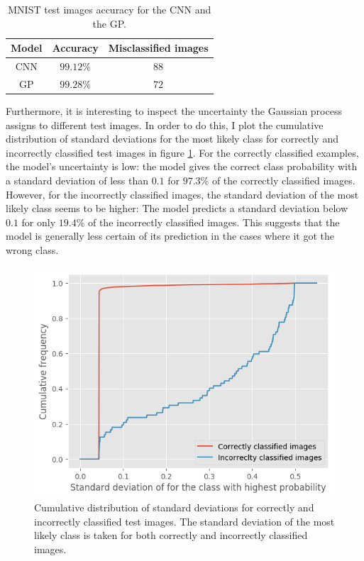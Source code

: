 \documentclass{article}
\begin{document}
\begin{table}[h]
\centering	
{\renewcommand{\arraystretch}{1.4} %
\begin{tabular}{ c | c c}
\textbf{Model} & \textbf{Accuracy} & \textbf{Misclassified images}\\
\hline
CNN & $99.12\%$ & $88$ \\
GP & $99.28\%$  & $72$\\
\end{tabular}
}
\caption{MNIST test images accuracy for the CNN and the GP.}
\label{table/mnist_acc}
\end{table}

Furthermore, it is interesting to inspect the uncertainty the Gaussian process assigns to different test images. In order to do this, I plot the cumulative distribution of standard deviations for the most likely class for correctly and incorrectly classified test images in figure \ref{fig/mnist_cum_stds}. For the correctly classified examples, the model's uncertainty is low: the model gives the correct class probability with a standard deviation of less than $0.1$ for $97.3\%$ of the correctly classified images. However, for the incorrectly classified images, the standard deviation of the most likely class seems to be higher: The model predicts a standard deviation below $0.1$ for only $19.4\%$ of the incorrectly classified images. This suggests that the model is generally less certain of its prediction in the cases where it got the wrong class.
\begin{figure}[h]
	\centering
	\includegraphics[scale=0.5]{mnist_cum_stds}
	\caption{Cumulative distribution of standard deviations for correctly and incorrectly classified test images. The standard deviation of the most likely class is taken for both correctly and incorrectly classified images.}
	\label{fig/mnist_cum_stds}
\end{figure}
\end{document}

